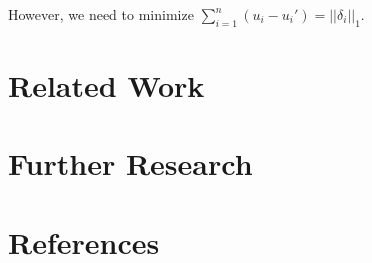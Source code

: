 \documentclass[11pt]{article}
\theoremstyle{definition}
\theoremstyle{corollary}
\begin{document}
    However, we need to minimize $\sum\limits_{i=1}^{n}(u_i-u_i') = ||\delta_i||_1$.

  \section{Related Work}

  \section{Further Research}

  \section{References}
\end{document}
